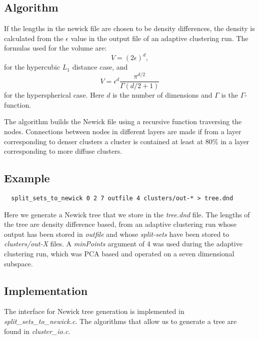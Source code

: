 \subsection{Algorithm}
If the lengths in the newick file are chosen to be density
differences, the density is calculated from the $\epsilon$ value in
the output file of an adaptive clustering run.
The formulas used for the volume are:
\begin{equation}
  V = (2\epsilon)^d,
\end{equation}
for the hypercubic $L_1$ distance case, and
\begin{equation}
  V = \epsilon^{d}\frac{\pi^{d/2}}{\Gamma(d/2+1)}
\end{equation}
for the hyperspherical case. Here $d$ is the number of dimensions
and $\Gamma$ is the $\Gamma$-function.

The algorithm builds the Newick file using a recursive function traversing
the nodes. Connections between nodes in different layers are made
if from a layer corresponding to denser clusters
a cluster is contained at least at 80\% in a layer corresponding to
more diffuse clusters. 

\subsection{Example}

\begin{lstlisting}
  split_sets_to_newick 0 2 7 outfile 4 clusters/out-* > tree.dnd
\end{lstlisting}
Here we generate a Newick tree that we store in the \emph{tree.dnd} file.
The lengths of the tree are density difference based, from an adaptive
clustering run whose output has been stored in \emph{outfile} and
whose \emph{split-sets} have been stored to \emph{clusters/out-X}
files. A \emph{minPoints} argument of 4 was used during the adaptive
clustering run, which was PCA based and operated on a seven
dimensional subspace. 

\subsection{Implementation}
The interface for Newick tree generation is implemented in
\emph{split\_sets\_to\_newick.c}. The algorithms that allow us to
generate a tree are found in \emph{cluster\_io.c}.
